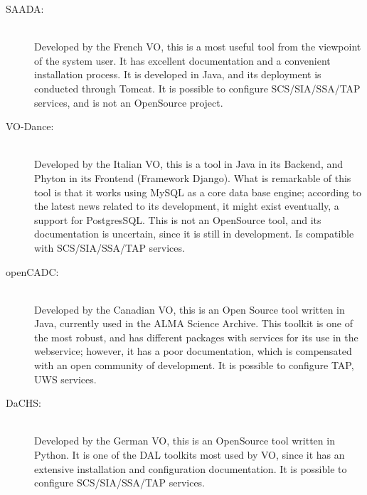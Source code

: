 \documentclass[]{spie}
\begin{document}
\begin{description}
    \item[SAADA:] \hfill \\
        Developed by the French VO, this is a most useful tool from the
        viewpoint of the system user.  It has excellent documentation and a
        convenient installation process. It is developed in Java, and its
        deployment is conducted through Tomcat.  It is possible to configure
        SCS/SIA/SSA/TAP services, and is not an OpenSource project.
    \item[VO-Dance:] \hfill \\
        Developed by the Italian VO, this is a tool in Java in its Backend, and
        Phyton in its Frontend (Framework Django). What is remarkable of this
        tool is that it works using MySQL as a core data base engine; according
        to the latest news related to its development, it might exist
        eventually, a support for PostgresSQL.  This is not an OpenSource tool,
        and its documentation is uncertain, since it is still in development.
        Is compatible with SCS/SIA/SSA/TAP services.
    \item[openCADC:] \hfill \\
        Developed by the Canadian VO, this is an Open Source tool written in
        Java, currently used in the ALMA Science Archive.  This toolkit is one
        of the most robust, and has different packages with services for its
        use in the webservice; however, it has a poor documentation, which is
        compensated with an open community of development.  It is possible to
        configure TAP, UWS services.
    \item[DaCHS:] \hfill \\
        Developed by the German VO, this is an OpenSource tool written in
        Python.  It is one of the DAL toolkits most used by VO, since it has an
        extensive installation and configuration documentation. It is possible
        to configure SCS/SIA/SSA/TAP services.
\end{description}
\end{document}
